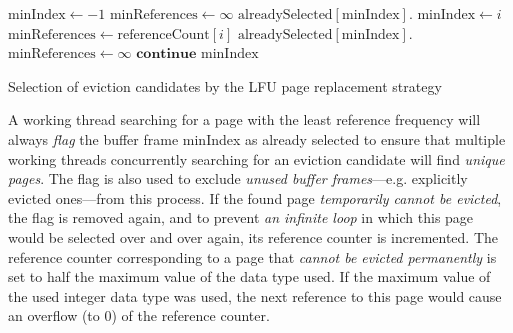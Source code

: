 \begin{@empty}
    \begin{algorithm}[h]
        \scriptsize
        \begin{algorithmic}[1]
                \State $\text{minIndex} \gets -1$
                \State $\text{minReferences} \gets \infty$
                                \State $\text{alreadySelected}\left[\text{minIndex}\right].$
                                \State $\text{minIndex} \gets i$
                                \State $\text{minReferences} \gets \text{referenceCount}\left[i\right]$
                            \EndIf
                        \EndIf
                    \EndFor
                        \State $\text{alreadySelected}\left[\text{minIndex}\right].$
                        \State $\text{minReferences} \gets \infty$
                        \State $\textbf{continue}$
                    \Else
                        \State \Return $\text{minIndex}$
                    \EndIf
                \EndWhile
            \EndFunction
        \end{algorithmic}
        \vspace{1em}
        \caption[{\footnotesize \textbf{function} \textsc{select}} of LFU]{Selection of eviction candidates by the LFU page replacement strategy}
        \label{alg:lfuselect}
    \end{algorithm}
\end{@empty}

    A working thread searching for a page with the least reference frequency will always \emph{flag} the buffer frame {\scriptsize minIndex} as already selected to ensure that multiple working threads concurrently searching for an eviction candidate will find \emph{unique pages}. The flag is also used to exclude \emph{unused buffer frames}---e.g. explicitly evicted ones---from this process. If the found page \emph{temporarily cannot be evicted}, the flag is removed again, and to prevent \emph{an infinite loop} in which this page would be selected over and over again, its reference counter is incremented. The reference counter corresponding to a page that \emph{cannot be evicted permanently} is set to half the maximum value of the data type used. If the maximum value of the used integer data type was used, the next reference to this page would cause an overflow (to $0$) of the reference counter.


